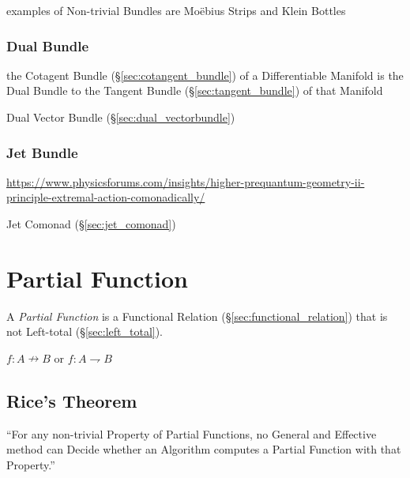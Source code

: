 examples of Non-trivial Bundles are Mo\"ebius Strips and Klein Bottles



\subsubsection{Dual Bundle}\label{sec:dual_bundle}

the Cotagent Bundle (\S\ref{sec:cotangent_bundle}) of a Differentiable Manifold
is the Dual Bundle to the Tangent Bundle (\S\ref{sec:tangent_bundle}) of that
Manifold

\fist Dual Vector Bundle (\S\ref{sec:dual_vectorbundle})



\subsubsection{Jet Bundle}\label{sec:jet_bundle}

\url{https://www.physicsforums.com/insights/higher-prequantum-geometry-ii-principle-extremal-action-comonadically/}

\fist Jet Comonad (\S\ref{sec:jet_comonad})





\section{Partial Function}\label{sec:partial_function}

A \emph{Partial Function} is a Functional Relation
(\S\ref{sec:functional_relation}) that is not Left-total
(\S\ref{sec:left_total}).

$f : A \nrightarrow B$ or $f : A \rightharpoondown B$




\subsection{Rice's Theorem}\label{sec:rices_theorem}

``For any non-trivial Property of Partial Functions, no General and
Effective method can Decide whether an Algorithm computes a Partial
Function with that Property.''



